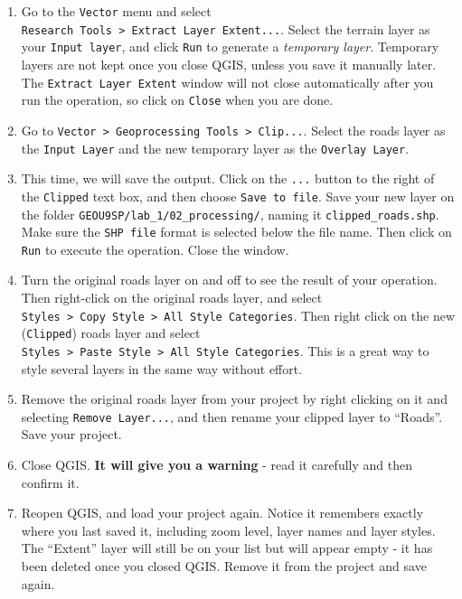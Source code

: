 \documentclass[
  letterpaper,
  DIV=11,
  numbers=noendperiod]{scrreprt}
\begin{document}
\begin{enumerate}
\def\labelenumi{(\arabic{enumi})}
\setcounter{enumi}{30}
\item
  Go to the \texttt{Vector} menu and select
  \texttt{Research\ Tools\ \textgreater{}\ Extract\ Layer\ Extent...}.
  Select the terrain layer as your \texttt{Input\ layer}, and click
  \texttt{Run} to generate a \emph{temporary layer}. Temporary layers
  are not kept once you close QGIS, unless you save it manually later.
  The \texttt{Extract\ Layer\ Extent} window will not close
  automatically after you run the operation, so click on \texttt{Close}
  when you are done.
\item
  Go to
  \texttt{Vector\ \textgreater{}\ Geoprocessing\ Tools\ \textgreater{}\ Clip...}.
  Select the roads layer as the \texttt{Input\ Layer} and the new
  temporary layer as the \texttt{Overlay\ Layer}.
\item
  This time, we will save the output. Click on the \texttt{...} button
  to the right of the \texttt{Clipped} text box, and then choose
  \texttt{Save\ to\ file}. Save your new layer on the folder
  \texttt{GEOU9SP/lab\_1/02\_processing/}, naming it
  \texttt{clipped\_roads.shp}. Make sure the \texttt{SHP\ file} format
  is selected below the file name. Then click on \texttt{Run} to execute
  the operation. Close the window.
\item
  Turn the original roads layer on and off to see the result of your
  operation. Then right-click on the original roads layer, and select
  \texttt{Styles\ \textgreater{}\ Copy\ Style\ \textgreater{}\ All\ Style\ Categories}.
  Then right click on the new (\texttt{Clipped}) roads layer and select
  \texttt{Styles\ \textgreater{}\ Paste\ Style\ \textgreater{}\ All\ Style\ Categories}.
  This is a great way to style several layers in the same way without
  effort.
\item
  Remove the original roads layer from your project by right clicking on
  it and selecting \texttt{Remove\ Layer...}, and then rename your
  clipped layer to ``Roads''. Save your project.
\item
  Close QGIS. \textbf{It will give you a warning} - read it carefully
  and then confirm it.
\item
  Reopen QGIS, and load your project again. Notice it remembers exactly
  where you last saved it, including zoom level, layer names and layer
  styles. The ``Extent'' layer will still be on your list but will
  appear empty - it has been deleted once you closed QGIS. Remove it
  from the project and save again.
\end{enumerate}
\end{document}
